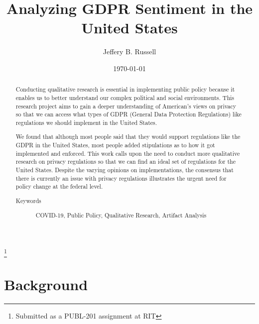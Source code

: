 \documentclass[12pt,
 reprint,
nofootinbib,
 amsmath,amssymb,
 aps,
]{revtex4-2}
\begin{document}

\title{Analyzing GDPR Sentiment in the United States}
\thanks{Submitted as a PUBL-201 assignment at RIT}%

\author{Jeffery B. Russell}
%

\date{\today}%




\begin{abstract}
Conducting qualitative research is essential in implementing public policy because it enables us to better understand our complex political and social environments.
This research project aims to gain a deeper understanding of American's views on privacy so that we can access what types of GDPR (General Data Protection Regulations) like regulations we should implement in the United States.

We found that although most people said that they would support regulations like the GDPR in the United States, most people added stipulations as to how it got implemented and enforced. 
This work calls upon the need to conduct more qualitative research on privacy regulations so that we can find an ideal set of regulations for the United States. 
Despite the varying opinions on implementations, the consensus that there is currently an issue with privacy regulations illustrates the urgent need for policy change at the federal level. 

\begin{description}
\item[Keywords]
COVID-19, Public Policy, Qualitative Research, Artifact Analysis
\end{description}

\end{abstract}
\maketitle





\section{Background}
\end{document}
